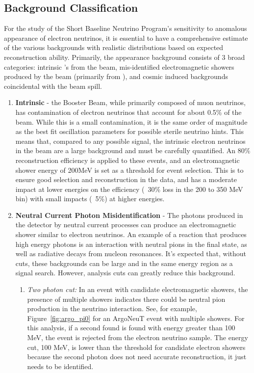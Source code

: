 \subsection{Background Classification}

For the study of the Short Baseline Neutrino Program's sensitivity to anomalous appearance of electron neutrinos, it is essential to have a comprehensive estimate of the various backgrounds with realistic distributions based on expected reconstruction ability.  Primarily, the \nue appearance background consists of 3 broad categories: intrinsic \nue's from the beam, mis-identified electromagnetic showers produced by the beam (primarily from \numu), and cosmic induced backgrounds coincidental with the beam spill.

\begin{enumerate}

  \item {\bf Intrinsic \nue } - the Booster Beam, while primarily composed of muon neutrinos, has contamination of electron neutrinos that account for about 0.5\% of the beam.  While this is a small contamination, it is the same order of magnitude as the best fit oscillation parameters for possible sterile neutrino hints. This means that, compared to any possible signal, the intrinsic electron neutrinos in the beam are a large background and must be carefully quantified.  An 80\% reconstruction efficiency is applied to these events, and an electromagnetic shower energy of 200MeV is set as a threshold for event selection.  This is to ensure good selection and reconstruction in the data, and has a moderate impact at lower energies on the efficiency (~30\% loss in the 200 to 350 MeV bin) with small impacts (~5\%) at higher energies.



  \item {\bf Neutral Current Photon Misidentification} - The photons produced in the detector by neutral current processes can produce an electromagnetic shower similar to electron neutrinos.  An example of a reaction that produces high energy photons is an interaction with neutral pions in the final state, as well as radiative decays from nucleon resonances. It's expected that, without cuts, these backgrounds can be large and in the same energy region as a signal search. However, analysis cuts can greatly reduce this background.

  \begin{enumerate}

    \item{\em Two photon cut:} In an event with candidate electromagnetic showers, the presence of multiple showers indicates there could be neutral pion production in the neutrino interaction.  See, for example, Figure~\ref{fig:argo_pi0} for an ArgoNeuT event with multiple showers.  For this analysis, if a second found is found with energy greater than 100 MeV, the event is rejected from the electron neutrino sample.  The energy cut, 100 MeV, is lower than the threshold for candidate electron showers because the second photon does not need accurate reconstruction, it just needs to be identified.


\end{enumerate}
\end{enumerate}
